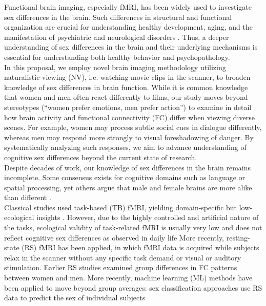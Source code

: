 \documentclass[11pt,a4paper]{article}
\begin{document}
Functional brain imaging, especially fMRI, has been widely used to investigate sex differences in the brain. 
Such differences in structural and functional organization are crucial for understanding healthy development, 
aging, and the manifestation of psychiatric and neurological disorders \parencite{cahillWhySexMatters2006,gobinathSexHormonesGenotype2017}. 
Thus, a deeper understanding of sex differences in the brain and their underlying mechanisms is essential 
for understanding both healthy behavior and psychopathology.\\
In this proposal, we employ novel brain imaging methodology utilizing naturalistic viewing (NV), i.e. watching movie 
clips in the scanner, to broaden knowledge of sex differences in brain function. While it is common knowledge 
that women and men often react differently to films, our study moves beyond stereotypes (“women prefer emotions, 
men prefer action”) to examine in detail how brain activity and functional connectivity (FC) differ when 
viewing diverse scenes. For example, women may process subtle social cues in dialogue differently, whereas 
men may respond more strongly to visual foreshadowing of danger. By systematically analyzing such responses, 
we aim to advance understanding of cognitive sex differences beyond the current state of research.\\
Despite decades of work, our knowledge of sex differences in the brain remains incomplete. Some consensus exists 
for cognitive domains such as language or spatial processing, yet others argue that male and female brains are more 
alike than different \parencite{joelSexGenitaliaHuman2015a}.\\
Classical studies used task-based (TB) fMRI, yielding domain-specific but low-ecological insights 
\parencite{thimmMenstrualCycleEffects2014a,weisDynamicChangesFunctional2011,weisEstradiolModulatesFunctional2008}. 
However, due to the highly controlled and artificial nature of the tasks, ecological validity of task-related fMRI is usually 
very low and does not reflect cognitive sex differences as observed in daily life
More recently, resting-state (RS) fMRI has been applied, in which fMRI data is acquired while subjects relax 
in the scanner without any specific task demand or visual or auditory stimulation.
Earlier RS studies examined group differences in FC patterns between women and men. 
More recently, machine learning (ML) methods have been applied to move beyond group averages: 
sex classification approaches use RS data to predict the sex of individual subjects 
\end{document}

